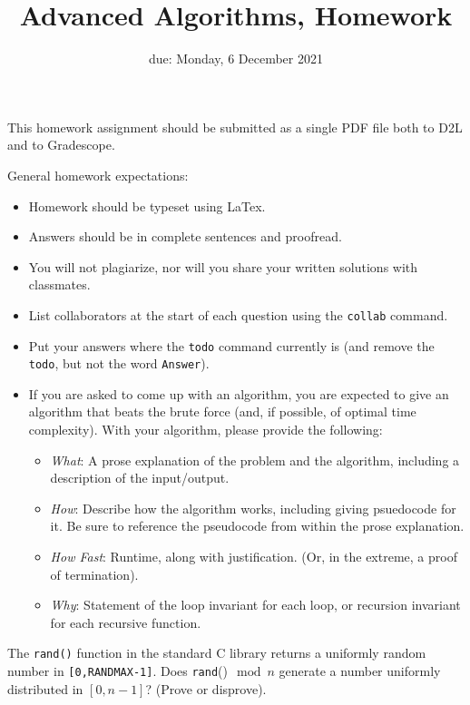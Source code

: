 \documentclass{article}
\title{Advanced Algorithms, Homework \hwnum}
\author{\todo{Your Name Here}}
\date{due: Monday, 6 December 2021}
\begin{document}
\maketitle

This homework assignment should be
submitted as a single PDF file both to D2L and to Gradescope.

General homework expectations:
\begin{itemize}
    \item Homework should be typeset using LaTex.
    \item Answers should be in complete sentences and proofread.
    \item You will not plagiarize, nor will you share your written solutions
        with classmates.
    \item List collaborators at the start of each question using the
        \texttt{collab} command.
    \item Put your answers where the \texttt{todo} command currently is (and
        remove the \texttt{todo}, but not the word \texttt{Answer}).
    \item If you are asked to come up with an algorithm, you are
        expected to give an algorithm that beats the brute force (and, if possible, of
        optimal time complexity). With your algorithm, please provide the following:
        \begin{itemize}
            \item \emph{What}: A prose explanation of the problem and the algorithm,
                including a description of the input/output.
            \item \emph{How}: Describe how the algorithm works, including giving
                psuedocode for it.  Be sure to reference the pseudocode
                from within the prose explanation.
            \item \emph{How Fast}: Runtime, along with justification.  (Or, in the
                extreme, a proof of termination).
            \item \emph{Why}: Statement of the loop invariant for each loop, or
                recursion invariant for each recursive function.
        \end{itemize}
\end{itemize}


\collab{\todo{}}
\nextprob{}

The \texttt{rand()} function in the standard C library returns a
uniformly random number in \texttt{[0,RANDMAX-1]}. Does \texttt{rand}()$\mod n$
generate a number uniformly distributed in $[0,n-1]$? (Prove or disprove).
\end{document}
